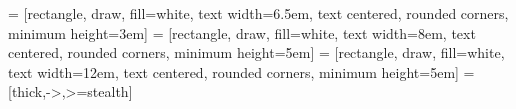 \usepackage{tabularx}
\usepackage{rotating}
\usepackage{enumitem}
\usepackage{array}
\usepackage{graphics}
\usepackage{tikz}
\usepackage{pgfplots}
\usepackage[export]{adjustbox}
\usepackage{float}
\usepackage{caption}
\usepackage{subcaption}
\usepackage{nameref}
\pgfplotsset{compat=1.17}
 = [rectangle, draw, fill=white,
text width=6.5em, text centered, rounded corners, minimum height=3em]
 = [rectangle, draw, fill=white,
text width=8em, text centered, rounded corners, minimum height=5em]
 = [rectangle, draw, fill=white,
text width=12em, text centered, rounded corners, minimum height=5em]
 = [thick,->,>=stealth]
